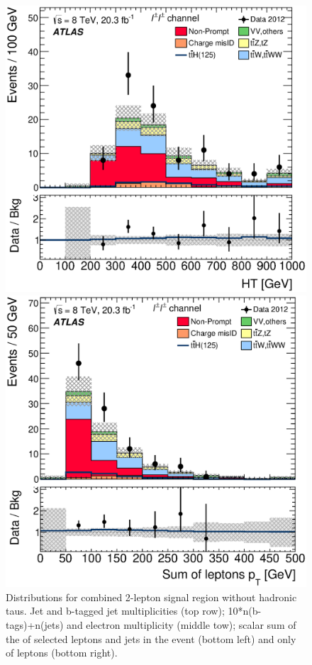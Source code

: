 \begin{figure}[!htbp]
\begin{minipage}[h]{0.4\textwidth}
  \end{minipage}\hfill
  \begin{minipage}[h]{0.4\textwidth}
    \centering \includegraphics[width=\textwidth]{figs/results/results_new/2lep_SR_HT}
  \end{minipage}\hfill
  \begin{minipage}[h]{0.4\textwidth}
    \centering \includegraphics[width=\textwidth]{figs/results/results_new/2lep_SR_SumPtLep}
  \end{minipage}\hfill
  \caption{Distributions for combined 2-lepton signal region without hadronic taus.
    Jet and b-tagged jet multiplicities (top row);
    10*n(b-tags)+n(jets) and electron multiplicity (middle tow);
    scalar sum of the \pt of selected leptons and jets in the event (bottom left) and only of leptons (bottom right).
}
  \label{figure:results_2l_event}
\end{figure} 
